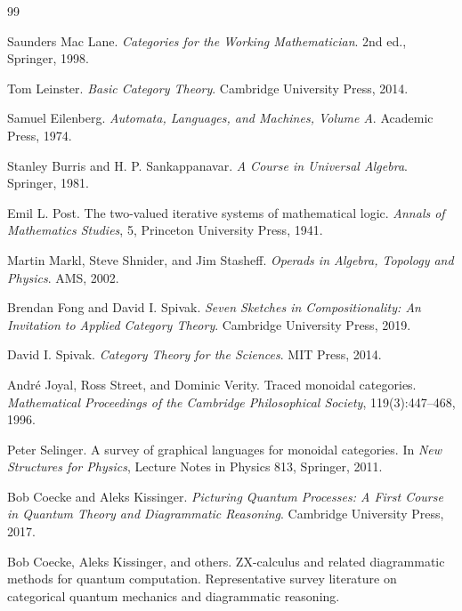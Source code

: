\begin{thebibliography}{99}

Saunders Mac Lane.
\newblock \emph{Categories for the Working Mathematician}.
\newblock 2nd ed., Springer, 1998.

Tom Leinster.
\newblock \emph{Basic Category Theory}.
\newblock Cambridge University Press, 2014.

Samuel Eilenberg.
\newblock \emph{Automata, Languages, and Machines, Volume A}.
\newblock Academic Press, 1974.

Stanley Burris and H. P. Sankappanavar.
\newblock \emph{A Course in Universal Algebra}.
\newblock Springer, 1981.

Emil L. Post.
\newblock The two-valued iterative systems of mathematical logic.
\newblock \emph{Annals of Mathematics Studies}, 5, Princeton University Press, 1941.

Martin Markl, Steve Shnider, and Jim Stasheff.
\newblock \emph{Operads in Algebra, Topology and Physics}.
\newblock AMS, 2002.

Brendan Fong and David I. Spivak.
\newblock \emph{Seven Sketches in Compositionality: An Invitation to Applied Category Theory}.
\newblock Cambridge University Press, 2019.

David I. Spivak.
\newblock \emph{Category Theory for the Sciences}.
\newblock MIT Press, 2014.

Andr\'e Joyal, Ross Street, and Dominic Verity.
\newblock Traced monoidal categories.
\newblock \emph{Mathematical Proceedings of the Cambridge Philosophical Society}, 119(3):447--468, 1996.

Peter Selinger.
\newblock A survey of graphical languages for monoidal categories.
\newblock In \emph{New Structures for Physics}, Lecture Notes in Physics 813, Springer, 2011.

Bob Coecke and Aleks Kissinger.
\newblock \emph{Picturing Quantum Processes: A First Course in Quantum Theory and Diagrammatic Reasoning}.
\newblock Cambridge University Press, 2017.

Bob Coecke, Aleks Kissinger, and others.
\newblock ZX-calculus and related diagrammatic methods for quantum computation.
\newblock Representative survey literature on categorical quantum mechanics and diagrammatic reasoning.


\end{thebibliography}
